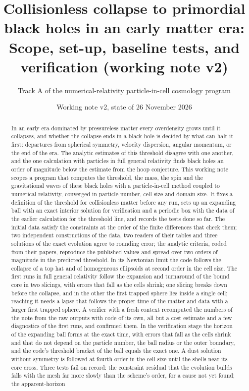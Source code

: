 \documentclass[aps,prd,twocolumn,10pt,superscriptaddress,nofootinbib,longbibliography,floatfix]{revtex4-2}
\begin{document}
\title{Collisionless collapse to primordial black holes in an early matter era:\\ Scope, set-up, baseline tests, and verification (working note v2)}

\author{Track A of the numerical-relativity particle-in-cell cosmology program}

\date{Working note v2, state of 26 November 2026}

\begin{abstract}
In an early era dominated by pressureless matter every overdensity grows until it collapses, and whether the collapse ends in a black hole is decided by what can halt it first: departures from spherical symmetry, velocity dispersion, angular momentum, or the end of the era. The analytic estimates of this threshold disagree with one another, and the one calculation with particles in full general relativity finds black holes an order of magnitude below the estimate from the hoop conjecture. This working note scopes a program that computes the threshold, the mass, the spin and the gravitational waves of these black holes with a particle-in-cell method coupled to numerical relativity, converged in particle number, cell size and domain size. It fixes a definition of the threshold for collisionless matter before any run, sets up an expanding ball with an exact interior solution for verification and a periodic box with the data of the earlier calculation for the threshold line, and records the tests done so far. The initial data satisfy the constraints at the order of the finite differences that check them; two independent constructions of the data, two readers of their tables and three solutions of the exact evolution agree to rounding error; the analytic criteria, coded from their papers, reproduce the published values and spread over two orders of magnitude in the predicted threshold. In its Newtonian limit the code follows the collapse of a top hat and of homogeneous ellipsoids at second order in the cell size. The first runs in full general relativity follow the expansion and turnaround of the bound core in two slicings, with errors that fall as the cells shrink; one slicing breaks down before the collapse, and in the other the first trapped sphere lies inside a single cell; reaching it needs a lapse that follows the proper time of the matter and data with a larger first trapped sphere. A verifier with a fresh context recomputed the numbers of the note from the raw outputs with code of its own, all but a cost estimate and a few diagnostics of the first runs, and confirmed them. In the verification stage the horizon of the expanding ball forms at the exact time, with errors that fall as the cells shrink and that do not depend on the particle number, the ball radius or the outer boundary, and the code's threshold bracket of the ball equals the exact one. A dust solution without symmetry is followed at fourth order in the cell size until the shells near its core cross. Three tests fail on record: the constraint residual that the evolution builds falls with the mesh far more slowly than the scheme's order, for a cause not yet found; the apparent-horizon 
\end{abstract}
\end{document}
